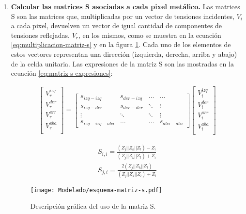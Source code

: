 \begin{enumerate}
	\item \textbf{Calcular las matrices S asociadas a cada pixel metálico.} Las matrices S son las matrices que, multiplicadas por un vector de tensiones incidentes, $V_i$ a cada pixel, devuelven un vector de igual cantidad de componentes de tensiones reflejadas, $V_r$, en los mismos, como se muestra en la ecuación \ref{eq:multiplicacion-matriz-s} y en la figura \ref{fig:esquema-matriz-s}. Cada uno de los elementos de estos vectores representan una dirección (izquierda, derecha, arriba y abajo) de la celda unitaria. Las expresiones de la matriz S son las mostradas en la ecuación \ref{eq:matriz-s-expresiones}:
	
	\begin{align}
		\label{eq:multiplicacion-matriz-s}
		\begin{bmatrix}
			V_r^{izq} \\
			V_r^{der} \\
			V_r^{arr} \\
			V_r^{aba} \\
		\end{bmatrix}
			=
		\begin{bmatrix}
			s_{izq-izq} & s_{der-izq} & \dots & \dots \\
			s_{izq-der} & s_{der-der} & \ddots & \vdots \\
			\vdots & \ddots & \ddots     & \vdots \\
			s_{izq-izq-aba} & \dots & \dots & s_{aba-aba}
		\end{bmatrix}
		\begin{bmatrix}
			V_i^{izq} \\
			V_i^{der} \\
			V_i^{arr} \\
			V_i^{aba} \\
		\end{bmatrix}
	\end{align}
	
	\begin{subequations}
		\label{eq:matriz-s-expresiones}
		\begin{align}
			S_{i,i} = \frac{(Z_{j}||Z_{k}||Z_{l}) -Z_{i}}{(Z_{j}||Z_{k}||Z_{l}) +Z_{i}} \\
			S_{j,i} = \frac{2 (Z_{j}||Z_{k}||Z_{l})}{(Z_{j}||Z_{k}||Z_{l}) +Z_{i}}
		\end{align}
	\end{subequations}
	
	\begin{figure}[h]
		\centering
		\texttt{[image: Modelado/esquema-matriz-s.pdf]}
		\caption{Descripción gráfica del uso de la matriz S.}
		\label{fig:esquema-matriz-s}
	\end{figure}
	

\end{enumerate}
